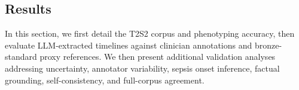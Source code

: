 \subsection{Results}

In this section, we first detail the T2S2 corpus and phenotyping accuracy, then evaluate LLM-extracted timelines against clinician annotations and bronze-standard proxy references.
We then present additional validation analyses addressing uncertainty, annotator variability, sepsis onset inference, factual grounding, self-consistency, and full-corpus agreement.


